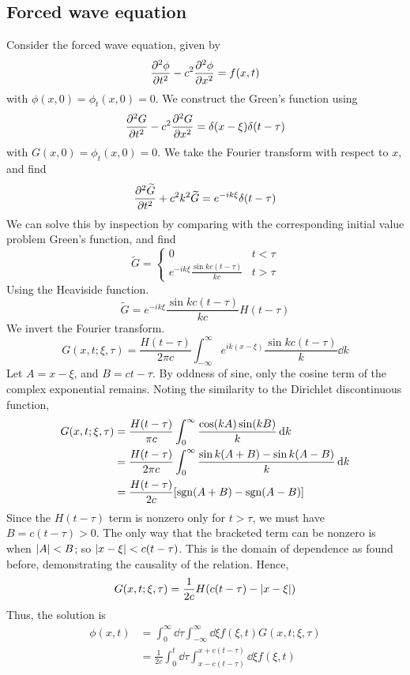 \subsection{Forced wave equation}
Consider the forced wave equation, given by
\[
	\pdv[2]{\phi}{t} - c^2 \pdv[2]{\phi}{x} = f(x,t)
\]
with \( \phi(x,0) = \phi_t(x,0) = 0 \).
We construct the Green's function using
\[
	\pdv[2]{G}{t} - c^2 \pdv[2]{G}{x} = \delta(x-\xi)\delta(t-\tau)
\]
with \( G(x,0) = \phi_t(x,0) = 0 \).
We take the Fourier transform with respect to \( x \), and find
\[
	\pdv[2]{\widetilde G}{t} + c^2 k^2 \widetilde G = e^{-ik\xi} \delta(t - \tau)
\]
We can solve this by inspection by comparing with the corresponding initial value problem Green's function, and find
\[
	\widetilde G = \begin{cases}
		0                                       & t < \tau \\
		e^{-ik\xi} \frac{\sin kc(t - \tau)}{kc} & t > \tau
	\end{cases}
\]
Using the Heaviside function.
\[
	\widetilde G = e^{-ik\xi} \frac{\sin kc(t - \tau)}{kc} H(t - \tau)
\]
We invert the Fourier transform.
\[
	G(x,t;\xi,\tau) = \frac{H(t-\tau)}{2\pi c} \int_{-\infty}^\infty e^{ik(x - \xi)} \frac{\sin kc(t - \tau)}{k} \dd{k}
\]
Let \( A = x - \xi \), and \( B = ct - \tau \).
By oddness of sine, only the cosine term of the complex exponential remains.
Noting the similarity to the Dirichlet discontinuous function,
\begin{align*}
	G(x,t;\xi,\tau) & = \frac{H(t-\tau)}{\pi c} \int_0^\infty \frac{\cos(kA) \sin(kB)}{k} \dd{k}          \\
	                & = \frac{H(t-\tau)}{2\pi c} \int_0^\infty \frac{\sin k(A+B) - \sin k(A-B)}{k} \dd{k} \\
	                & = \frac{H(t-\tau)}{2c} \qty[ \operatorname{sgn}(A+B) - \operatorname{sgn}(A-B) ]
\end{align*}
Since the \( H(t - \tau) \) term is nonzero only for \( t > \tau \), we must have \( B = c(t-\tau) > 0 \).
The only way that the bracketed term can be nonzero is when \( \abs{A} < B \); so \( \abs{x - \xi} < c(t-\tau) \).
This is the domain of dependence as found before, demonstrating the causality of the relation.
Hence,
\[
	G(x,t;\xi,\tau) = \frac{1}{2c} H(c(t-\tau) - \abs{x - \xi})
\]
Thus, the solution is
\begin{align*}
	\phi(x,t) & = \int_0^\infty \dd{\tau} \int_{-\infty}^\infty \dd{\xi} f(\xi, t) G(x,t;\xi,\tau)          \\
	          & = \frac{1}{2c} \int_0^t \dd{\tau} \int_{x - c(t-\tau)}^{x + c(t - \tau)} \dd{\xi} f(\xi, t)
\end{align*}

